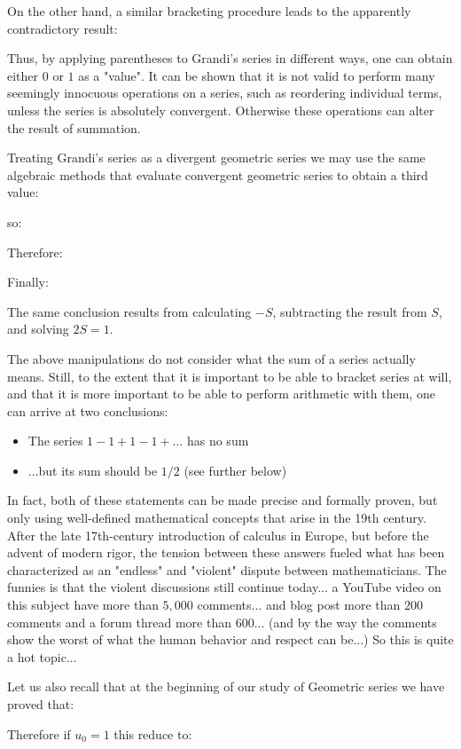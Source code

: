	On the other hand, a similar bracketing procedure leads to the apparently contradictory result:
	
	Thus, by applying parentheses to Grandi's series in different ways, one can obtain either $0$ or $1$ as a "value". It can be shown that it is not valid to perform many seemingly innocuous operations on a series, such as reordering individual terms, unless the series is absolutely convergent. Otherwise these operations can alter the result of summation.

	Treating Grandi's series as a divergent geometric series we may use the same algebraic methods that evaluate convergent geometric series to obtain a third value:
	
	so:
	
	Therefore:
	
	Finally:
	
	The same conclusion results from calculating $-S$, subtracting the result from $S$, and solving $2S = 1$.

	The above manipulations do not consider what the sum of a series actually means. Still, to the extent that it is important to be able to bracket series at will, and that it is more important to be able to perform arithmetic with them, one can arrive at two conclusions:
	\begin{itemize}
		\item The series $1-1 + 1-1 + \ldots$ has no sum

		\item ...but its sum should be $1/2$ (see further below)
	\end{itemize}
	In fact, both of these statements can be made precise and formally proven, but only using well-defined mathematical concepts that arise in the 19th century. After the late 17th-century introduction of calculus in Europe, but before the advent of modern rigor, the tension between these answers fueled what has been characterized as an "endless" and "violent" dispute between mathematicians. The funnies is that the violent discussions still continue today... a YouTube video on this subject have more than $5,000$ comments... and blog post more than $200$ comments and a forum thread more than $600$... (and by the way the comments show the worst of what the human behavior and respect can be...) So this is quite a hot topic...
	
	Let us also recall that at the beginning of our study of Geometric series we have proved that:
	
	Therefore if $u_0=1$ this reduce to:
		
